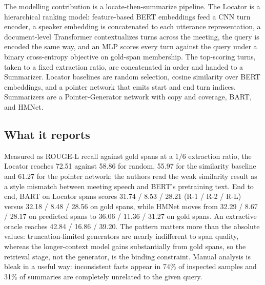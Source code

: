 The modelling contribution is a locate-then-summarize pipeline. The Locator is a hierarchical ranking model: feature-based BERT embeddings feed a CNN turn encoder, a speaker embedding is concatenated to each utterance representation, a document-level Transformer contextualizes turns across the meeting, the query is encoded the same way, and an MLP scores every turn against the query under a binary cross-entropy objective on gold-span membership. The top-scoring turns, taken to a fixed extraction ratio, are concatenated in order and handed to a Summarizer. Locator baselines are random selection, cosine similarity over BERT embeddings, and a pointer network that emits start and end turn indices. Summarizers are a Pointer-Generator network with copy and coverage, BART, and HMNet.

\begin{center}
\end{center}

\subsection{What it reports}

Measured as ROUGE-L recall against gold spans at a $1/6$ extraction ratio, the Locator reaches 72.51 against 58.86 for random, 55.97 for the similarity baseline and 61.27 for the pointer network; the authors read the weak similarity result as a style mismatch between meeting speech and BERT's pretraining text. End to end, BART on Locator spans scores 31.74 / 8.53 / 28.21 (R-1 / R-2 / R-L) versus 32.18 / 8.48 / 28.56 on gold spans, while HMNet moves from 32.29 / 8.67 / 28.17 on predicted spans to 36.06 / 11.36 / 31.27 on gold spans. An extractive oracle reaches 42.84 / 16.86 / 39.20. The pattern matters more than the absolute values: truncation-limited generators are nearly indifferent to span quality, whereas the longer-context model gains substantially from gold spans, so the retrieval stage, not the generator, is the binding constraint. Manual analysis is bleak in a useful way: inconsistent facts appear in 74\% of inspected samples and 31\% of summaries are completely unrelated to the given query.

